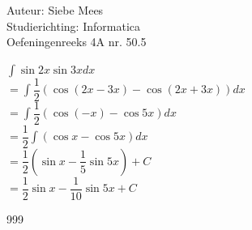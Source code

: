 \documentclass[a4paper]{article}
\begin{document}
  
\noindent \large Auteur: Siebe Mees \\
\noindent \large Studierichting: Informatica\\
\noindent \large Oefeningenreeks 4A nr. 50.5\\

\medskip

\normalsize

$ \displaystyle\int \sin 2x \sin 3x dx $\\

$ = \displaystyle\int \dfrac{1}{2} \left( \cos ( 2x - 3x ) - \cos ( 2x + 3x ) \right) dx $\\

$ = \displaystyle\int \dfrac{1}{2} \left( \cos ( -x ) - \cos 5x \right) dx $\\

$ = \dfrac{1}{2} \displaystyle\int \left( \cos x - \cos 5x \right) dx $\\

$ = \dfrac{1}{2} \left( \sin x - \dfrac{1}{5} \sin 5x \right) + C $\\

$ = \dfrac{1}{2} \sin x - \dfrac{1}{10} \sin 5x + C $\\

\begin{thebibliography}{999}
\end{thebibliography}
\end{document}
